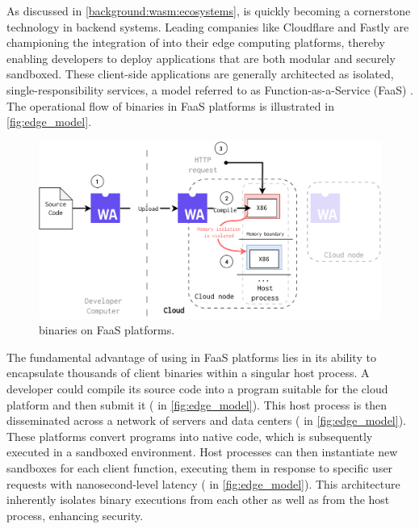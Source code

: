 


As discussed in \autoref{background:wasm:ecosystems}, \Wasm is quickly becoming a cornerstone technology in backend systems. 
Leading companies like Cloudflare and Fastly are championing the integration of \Wasm into their edge computing platforms, thereby enabling developers to deploy applications that are both modular and securely sandboxed. 
These client-side \Wasm applications are generally architected as isolated, single-responsibility services, a model referred to as Function-as-a-Service (FaaS) \cite{pMendkiServerless, 1244493Jacobsson}. 
The operational flow of \Wasm binaries in FaaS platforms is illustrated in \autoref{fig:edge_model}.

\begin{figure}[h]
    \centering
    \includegraphics[width=0.8\linewidth]{figures/edge.pdf}
    \caption{\Wasm binaries on FaaS platforms.}
    \label{fig:edge_model}
\end{figure}


The fundamental advantage of using \Wasm in FaaS platforms lies in its ability to encapsulate thousands of client \Wasm binaries within a singular host process.
A developer could compile its source code into a \Wasm program suitable for the cloud platform and then submit it ( in \autoref{fig:edge_model}).
This host process is then disseminated across a network of servers and data centers ( in \autoref{fig:edge_model}). 
These platforms convert \Wasm programs into native code, which is subsequently executed in a sandboxed environment. 
Host processes can then instantiate new \Wasm sandboxes for each client function, executing them in response to specific user requests with nanosecond-level latency ( in \autoref{fig:edge_model}). 
This architecture inherently isolates \Wasm binary executions from each other as well as from the host process, enhancing security.

